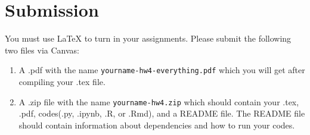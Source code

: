\documentclass{article}
\begin{document}
\section{Submission}
You must use \LaTeX{} to turn in your assignments. Please submit the following two files via Canvas:
\begin{enumerate}
    \item A .pdf  with the name \texttt{yourname-hw4-everything.pdf} which you will get after compiling your .tex file.
    \item A .zip file with the name \texttt{yourname-hw4.zip} which should contain your .tex, .pdf, codes(.py, .ipynb, .R, or .Rmd), and a README file. The README file should contain information about dependencies and how to run your codes.
\end{enumerate}
\end{document}
